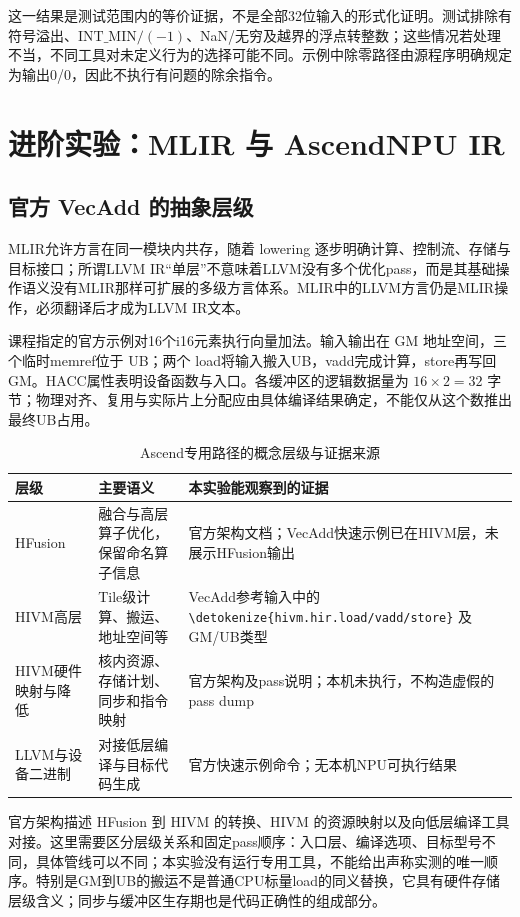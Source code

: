 \documentclass[UTF8,a4paper,10pt,fontset=none]{ctexart}
\newcommand{\code}[1]{{\small\expandafter\nolinkurl\expandafter{\detokenize{#1}}}}
\begin{document}
这一结果是测试范围内的等价证据，不是全部32位输入的形式化证明。测试排除有符号溢出、$\mathrm{INT\_MIN}/(-1)$、NaN/无穷及越界的浮点转整数；这些情况若处理不当，不同工具对未定义行为的选择可能不同。示例中除零路径由源程序明确规定为输出0/0，因此不执行有问题的除余指令。

\section{进阶实验：MLIR 与 AscendNPU IR}
\subsection{官方 VecAdd 的抽象层级}
MLIR允许方言在同一模块内共存，随着 lowering 逐步明确计算、控制流、存储与目标接口；所谓LLVM IR“单层”不意味着LLVM没有多个优化pass，而是其基础操作语义没有MLIR那样可扩展的多级方言体系\cite{mlirpaper}。MLIR中的LLVM方言仍是MLIR操作，必须翻译后才成为LLVM IR文本\cite{targetllvm}。

课程指定的官方示例对16个i16元素执行向量加法\cite{ascendexample}。输入输出在 GM 地址空间，三个临时memref位于 UB；两个 load将输入搬入UB，vadd完成计算，store再写回GM。HACC属性表明设备函数与入口。各缓冲区的逻辑数据量为 $16\times2=32$ 字节；物理对齐、复用与实际片上分配应由具体编译结果确定，不能仅从这个数推出最终UB占用。

\begin{table}[H]
\centering\small
\begin{tabularx}{\linewidth}{lYY}
\toprule 层级 & 主要语义 & 本实验能观察到的证据 \\
\midrule
HFusion & 融合与高层算子优化，保留命名算子信息 & 官方架构文档；VecAdd快速示例已在HIVM层，未展示HFusion输出 \\
HIVM高层 & Tile级计算、搬运、地址空间等 & VecAdd参考输入中的 \code{hivm.hir.load/vadd/store} 及 GM/UB类型 \\
HIVM硬件映射与降低 & 核内资源、存储计划、同步和指令映射 & 官方架构及pass说明；本机未执行，不构造虚假的pass dump \\
LLVM与设备二进制 & 对接低层编译与目标代码生成 & 官方快速示例命令；无本机NPU可执行结果 \\
\bottomrule
\end{tabularx}
\caption{Ascend专用路径的概念层级与证据来源}
\end{table}

官方架构描述 HFusion 到 HIVM 的转换、HIVM 的资源映射以及向低层编译工具对接\cite{ascendarch}。这里需要区分层级关系和固定pass顺序：入口层、编译选项、目标型号不同，具体管线可以不同；本实验没有运行专用工具，不能给出声称实测的唯一顺序。特别是GM到UB的搬运不是普通CPU标量load的同义替换，它具有硬件存储层级含义；同步与缓冲区生存期也是代码正确性的组成部分。
\end{document}
